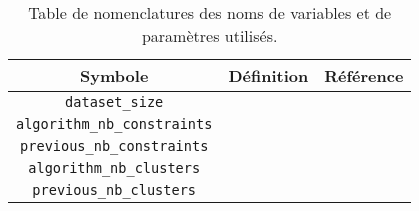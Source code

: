 	\begin{table}[!htb]
	\begin{center}
	\begin{tabular}{|c|l|l|}
	
		\hline
		\rowcolor{colorTableHeader!15}
		Symbole
			& Définition
			& Référence
			\tabularnewline
			\hline \hline
			
		\texttt{dataset\_size}
			&
			&
			\tabularnewline
			\hline
			
		\texttt{algorithm\_nb\_constraints}
			&
			&
			\tabularnewline
			\hline
			
		\texttt{previous\_nb\_constraints}
			&
			&
			\tabularnewline
			\hline
			
		\texttt{algorithm\_nb\_clusters}
			&
			&
			\tabularnewline
			\hline
			
		\texttt{previous\_nb\_clusters}
			&
			&
			\tabularnewline
			\hline
		
		\end{tabular}
		\end{center}
		\caption{
			Table de nomenclatures des noms de variables et de paramètres utilisés.
		}
		\label{table:C.1-DESCRIPTION-IMPLEMENTATION-NOMENCLATURES-VARIABLES}
	\end{table}
